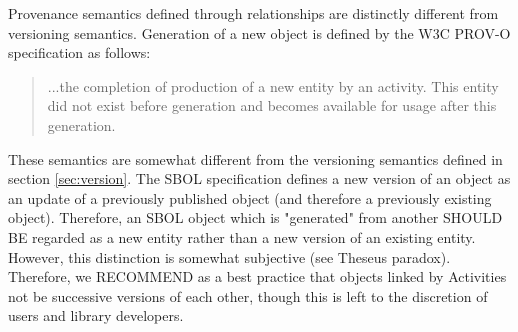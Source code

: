 {Provenance semantics defined through  relationships are distinctly different from versioning semantics. Generation of a new object is defined by the W3C PROV-O specification as follows:
\begin{quote}
...the completion of production of a new entity by an activity. This entity did not exist before generation and becomes available for usage after this generation.
\end{quote}
These semantics are somewhat different from the versioning semantics defined in section \ref{sec:version}. The SBOL specification defines a new version of an object as an update of a previously published object (and therefore a previously existing object). Therefore, an SBOL object which is "generated" from another SHOULD BE regarded as a new entity rather than a new version of an existing entity. However, this distinction is somewhat subjective (see Theseus paradox). Therefore, we RECOMMEND as a best practice that objects linked by Activities not be successive versions of each other, though this is left to the discretion of users and library developers.
} 


